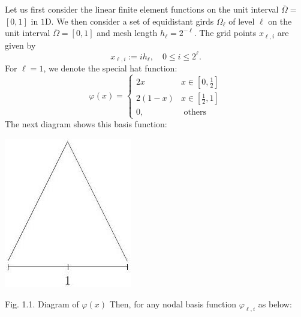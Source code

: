 \documentclass[10pt]{article}
\begin{document}
Let us first consider the linear finite element functions on the unit interval $\bar{\Omega}=$ $[0,1]$ in $1 \mathrm{D}$. We then consider a set of equidistant girds $\Omega_{\ell}$ of level $\ell$ on the unit interval $\bar{\Omega}=[0,1]$ and mesh length $h_{\ell}=2^{-\ell}$. The grid points $x_{\ell, i}$ are given by
$$
x_{\ell, i}:=i h_{\ell}, \quad 0 \leq i \leq 2^{\ell} .
$$
For $\ell=1$, we denote the special hat function:
$$
\varphi(x)= \begin{cases}2 x & x \in\left[0, \frac{1}{2}\right] \\ 2(1-x) & x \in\left[\frac{1}{2}, 1\right] \\ 0, & \text { others }\end{cases}
$$
The next diagram shows this basis function:

\includegraphics[max width=\textwidth]{2022_01_05_e65f0d6bf0db4974ee45g-05}

Fig. 1.1. Diagram of $\varphi(x)$ Then, for any nodal basis function $\varphi_{\ell, i}$ as below:
\end{document}
